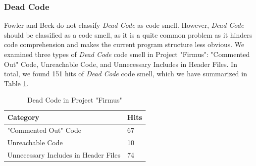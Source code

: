 



\subsubsection{Dead Code}
Fowler and Beck\cite{1999:RID:311424} do not classify \textit{Dead Code} as code smell. However, \textit{Dead Code} should be classified as a code smell, as it is a quite common problem as it hinders code comprehension and makes the current program structure less obvious\cite{mantyla2003taxonomy}. We examined three types of \textit{Dead Code} code smell in Project "Firmus": "Commented Out" Code, Unreachable Code, and Unnecessary Includes in Header Files. In total, we found 151 hits of \textit{Dead Code} code smell, which we have summarized in Table \ref{tab:deadCode}.

\begin{table}[ht!]
\centering
\caption{Dead Code in Project "Firmus"}
\label{tab:deadCode}
\begin{tabular}{|l|l|}
\hline
\textbf{Category}		& 	\textbf{Hits} \\ \hline
"Commented Out" Code 			&	67  \\ \hline
Unreachable Code 	& 	10	 \\ \hline
Unnecessary Includes in Header Files 	& 	74	 \\ \hline
\end{tabular}
\end{table}









































